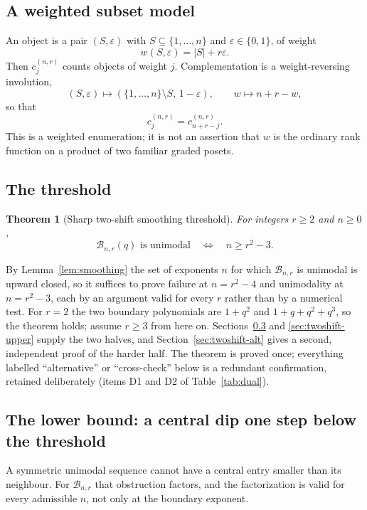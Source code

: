 \documentclass[11pt]{article}
\theoremstyle{research}
\newtheorem{theorem}{Theorem}[section]
\theoremstyle{definition}
\newcommand{\TS}{\mathcal B}
\numberwithin{equation}{section}
\begin{document}
\subsection{A weighted subset model}
An object is a pair $(S,\varepsilon)$ with
$S\subseteq\{1,\ldots,n\}$ and $\varepsilon\in\{0,1\}$, of weight
\[
 w(S,\varepsilon)=|S|+r\varepsilon .
\]
Then $c_j^{(n,r)}$ counts objects of weight $j$. Complementation is a
weight-reversing involution,
\[
 (S,\varepsilon)\longmapsto
   (\{1,\ldots,n\}\setminus S,\,1-\varepsilon),
 \qquad w\longmapsto n+r-w,
\]
so that
\begin{equation}\label{eq:symmetry}
 c_j^{(n,r)}=c_{n+r-j}^{(n,r)} .
\end{equation}
This is a weighted enumeration; it is not an assertion that $w$ is the
ordinary rank function on a product of two familiar graded posets.

\subsection{The threshold}
\begin{theorem}[Sharp two-shift smoothing threshold]\label{thm:twoshift}
For integers $r\ge2$ and $n\ge0$,
\begin{equation}\label{eq:twoshift}
 \TS_{n,r}(q)\text{ is unimodal}
 \quad\Longleftrightarrow\quad n\ge r^2-3.
\end{equation}
\end{theorem}

By Lemma~\ref{lem:smoothing} the set of exponents $n$ for which
$\TS_{n,r}$ is unimodal is upward closed, so it suffices to prove failure
at $n=r^2-4$ and unimodality at $n=r^2-3$, each by an argument valid for
every $r$ rather than by a numerical test.
For $r=2$ the two boundary polynomials are $1+q^2$ and $1+q+q^2+q^3$, so
the theorem holds; assume $r\ge3$ from here on.
Sections~\ref{sec:twoshift-lower} and \ref{sec:twoshift-upper} supply the
two halves, and Section~\ref{sec:twoshift-alt} gives a second, independent
proof of the harder half.
The theorem is proved once; everything labelled ``alternative'' or
``cross-check'' below is a redundant confirmation, retained deliberately
(items D1 and D2 of Table~\ref{tab:dual}).

\subsection{The lower bound: a central dip one step below the threshold}
\label{sec:twoshift-lower}
A symmetric unimodal sequence cannot have a central entry smaller than its
neighbour. For $\TS_{n,r}$ that obstruction factors, and the factorization
is valid for every admissible $n$, not only at the boundary exponent.
\end{document}
